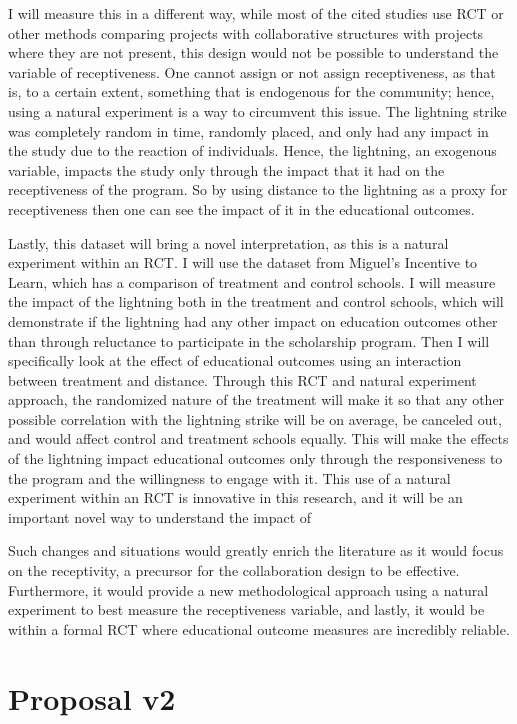 \documentclass{article}
\begin{document}
I will measure this in a different way, while most of the cited studies use RCT or other methods comparing projects with collaborative structures with projects where they are not present, this design would not be possible to understand the variable of receptiveness. One cannot assign or not assign receptiveness, as that is, to a certain extent, something that is endogenous for the community; hence, using a natural experiment is a way to circumvent this issue. The lightning strike was completely random in time, randomly placed, and only had any impact in the study due to the reaction of individuals. Hence, the lightning, an exogenous variable, impacts the study only through the impact that it had on the receptiveness of the program. So by using distance to the lightning as a proxy for receptiveness then one can see the impact of it in the educational outcomes. 

Lastly, this dataset will bring a novel interpretation, as this is a natural experiment within an RCT. I will use the dataset from Miguel's Incentive to Learn, which has a comparison of treatment and control schools. I will measure the impact of the lightning both in the treatment and control schools, which will demonstrate if the lightning had any other impact on education outcomes other than through reluctance to participate in the scholarship program. Then I will specifically look at the effect of educational outcomes using an interaction between treatment and distance. Through this RCT and natural experiment approach, the randomized nature of the treatment will make it so that any other possible correlation with the lightning strike will be on average, be canceled out, and would affect control and treatment schools equally. This will make the effects of the lightning impact educational outcomes only through the responsiveness to the program and the willingness to engage with it. This use of a natural experiment within an RCT is innovative in this research, and it will be an important novel way to understand the impact of 

Such changes and situations would greatly enrich the literature as it would focus on the receptivity, a precursor for the collaboration design to be effective. Furthermore, it would provide a new methodological approach using a natural experiment to best measure the receptiveness variable, and lastly, it would be within a formal RCT where educational outcome measures are incredibly reliable. 

\section{Proposal v2}
\end{document}
